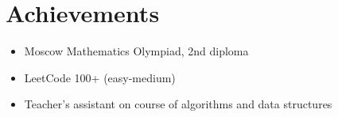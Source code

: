 \documentclass[letterpaper,11pt]{article}
\newcommand{\resumeItem}[1]{
  \item\small{
    {#1 \vspace{-2pt}}
  }
}
\newcommand{\resumeItemListStart}{\begin{itemize}}
\newcommand{\resumeItemListEnd}{\end{itemize}\vspace{-5pt}}
\begin{document}
\section{Achievements}
\resumeItemListStart
\resumeItem{\normalsize{Moscow Mathematics
		Olympiad, 2nd diploma}}
\resumeItem{\normalsize{LeetCode 100+ (easy-medium)}}
\resumeItem{\normalsize{Teacher's assistant on course of algorithms and data structures}}
\resumeItemListEnd





\end{document}
